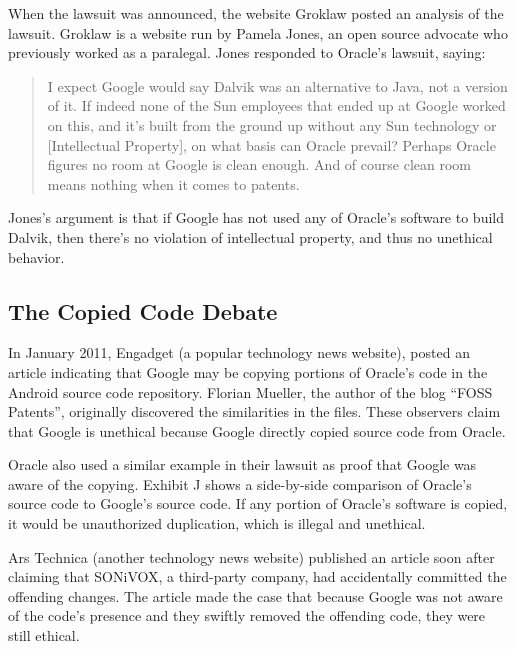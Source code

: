 \documentclass[11pt]{article}
\begin{document}
\begin{multicols}{2}
When the lawsuit was announced, the website Groklaw posted an analysis of the
lawsuit.  Groklaw is a website run by Pamela Jones, an open source advocate who
previously worked as a paralegal. \cite{groklaw-pj} Jones responded to Oracle's
lawsuit, saying: \cite{groklaw}

\begin{quotation}
I expect Google would say Dalvik was an alternative to Java, not a version of
it. If indeed none of the Sun employees that ended up at Google worked on this,
and it's built from the ground up without any Sun technology or [Intellectual
Property], on what basis can Oracle prevail? Perhaps Oracle figures no room at
Google is clean enough. And of course clean room means nothing when it comes to
patents.
\end{quotation}

Jones's argument is that if Google has not used any of Oracle's software to
build Dalvik, then there's no violation of intellectual property, and thus no
unethical behavior.


\subsection{The Copied Code Debate} %
\label{sub:fosspatents}

In January 2011, Engadget (a popular technology news website), posted an article
indicating that Google may be copying portions of Oracle's code in the Android
source code repository.  \cite{android-copies-java-code}  Florian Mueller, the
author of the blog ``FOSS Patents'', originally discovered the similarities in
the files.  \cite{fosspatents} These observers claim that Google is unethical
because Google directly copied source code from Oracle.


Oracle also used a similar example in their lawsuit as proof that Google was
aware of the copying.  Exhibit J shows a side-by-side comparison of Oracle's
source code to Google's source code.  If any portion of Oracle's software is
copied, it would be unauthorized duplication, which is illegal and unethical.

Ars Technica (another technology news website) published an article soon after
claiming that SONiVOX, a third-party company, had accidentally committed the
offending changes.  \cite{ars-tech-copying}  The article made the case that
because Google was not aware of the code's presence and they swiftly removed the
offending code, they were still ethical.


\end{multicols}
\end{document}
